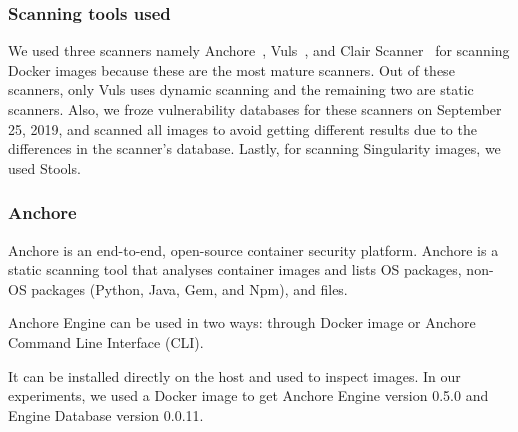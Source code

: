 \documentclass[a4paper,num-refs]{oup-contemporary}
\begin{document}
\subsubsection{Scanning tools used}

We used three scanners namely Anchore~\cite{github_2019}, Vuls~\cite{future-architect_2019}, and
Clair Scanner~\cite{arminc_2019} for scanning Docker images because these are the most
mature scanners. Out of these scanners, only Vuls uses dynamic scanning and the remaining two
are static scanners.
Also, we froze vulnerability databases for these scanners on September 25, 2019, and scanned
all images to avoid getting different results due to the differences in the scanner's database.
Lastly, for scanning Singularity images, we used Stools.

\subsubsection{Anchore}

Anchore is an end-to-end, open-source container security platform. Anchore
is a static
scanning tool that analyses container images and lists OS
packages, non-OS packages (Python, Java, Gem, and Npm), and files.

Anchore Engine can be used in two ways: through Docker image or Anchore
Command Line Interface (CLI).

It can be
installed directly on the host and used to inspect images.
In our experiments, we used a Docker image to get Anchore Engine version 0.5.0 and Engine Database
version 0.0.11.
\end{document}
